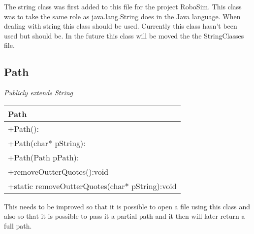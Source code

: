 The string class was first added to this file for the project RoboSim. This class was to take the same role as java.lang.String does in the Java language. When dealing with string this class should be used. Currently this class hasn't been used but should be. In the future this class will be moved the the StringClasses file.

\subsection{Path}
\emph{Publicly extends String}\\
\begin{table}[h]
\begin{tabular}{|l|}\hline
\textbf{Path}\\ \hline
+Path():\\
+Path(char* pString):\\
+Path(Path\ands\xspace pPath):\\
+removeOutterQuotes():void\\
+static removeOutterQuotes(char* pString):void\\ \hline
\end{tabular}
\end{table}

This needs to be improved so that it is possible to open a file using this class and also so that it is possible to pass it a partial path and it then will later return a full path.

